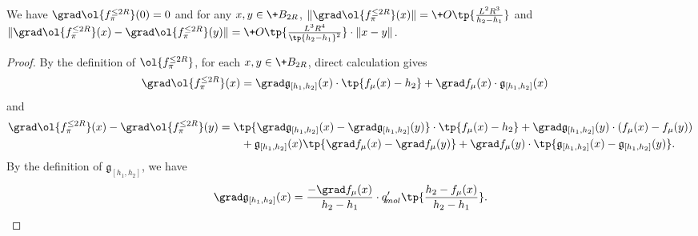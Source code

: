 \begin{lemma}\label{lem:smooth1}
    We have $\grad \ol{f^{\le 2R}_\pi}(0)=0$ and for any $x,y \in \+B_{2R}$, $\| \grad \ol{f^{\le 2R}_\pi}(x) \| = \+O\tp{\frac{L^2R^3}{h_2-h_1}}$ and $\| \grad \ol{f^{\le 2R}_\pi}(x) - \grad \ol{f^{\le 2R}_\pi}(y) \| =  \+O\tp{\frac{L^3R^4}{\tp{h_2-h_1}^2}}\cdot \|x-y\|$.  
\end{lemma}
\begin{proof}
        By the definition of $\ol{f^{\le 2R}_\pi}$, for each $x,y\in \+B_{2R}$, direct calculation gives
        \begin{align*}
            \grad \ol{f^{\le 2R}_\pi}(x) &= \grad \mathfrak{g}_{[h_1,h_2]}(x) 
            \cdot \tp{f_\mu(x) - h_2} + \grad f_\mu(x) \cdot \mathfrak{g}_{[h_1,h_2]}(x)
        \end{align*}
        and 
        \begin{align}
            \grad \ol{f^{\le 2R}_\pi}(x) - \grad \ol{f^{\le 2R}_\pi}(y) &= \tp{\grad \mathfrak{g}_{[h_1,h_2]}(x) - \grad \mathfrak{g}_{[h_1,h_2]}(y) }\cdot \tp{f_\mu(x) - h_2} + \grad \mathfrak{g}_{[h_1,h_2]}(y) \cdot (f_\mu(x)-f_{\mu}(y)) \notag \\
            &\quad\quad +\mathfrak{g}_{[h_1,h_2]}(x) \tp{\grad f_\mu(x) - \grad f_\mu(y)} + \grad f_\mu(y)\cdot \tp{\mathfrak{g}_{[h_1,h_2]}(x) - \mathfrak{g}_{[h_1,h_2]}(y)}. \notag
        \end{align}
        By the definition of $\mathfrak{g}_{[h_1,h_2]}$, we have
        \[
            \grad \mathfrak{g}_{[h_1,h_2]}(x) = \frac{-\grad f_\mu(x)}{h_2-h_1} \cdot q_{\!{mol}}'\tp{\frac{ h_2 - f_\mu(x) }{ h_2 - h_1 }}.
        \]

\end{proof}
